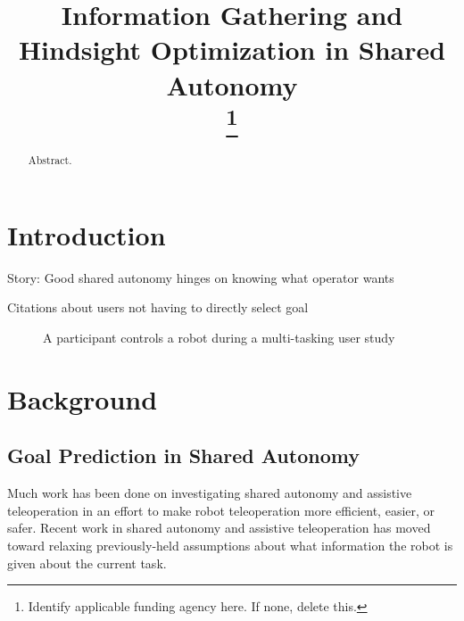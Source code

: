 \documentclass[conference]{IEEEtran}
\begin{document}
\title{Information Gathering and Hindsight Optimization in Shared Autonomy\\
\thanks{Identify applicable funding agency here. If none, delete this.}
}

\author{
\and
{}
}

\maketitle

\begin{abstract}
Abstract.
\end{abstract}

\section{Introduction}

Story: Good shared autonomy hinges on knowing what operator wants

Citations about users not having to directly select goal

\begin{figure}
\caption{A participant controls a robot during a multi-tasking user study}
\label{teaser}
\end{figure}

\section{Background}
\subsection{Goal Prediction in Shared Autonomy}

Much work has been done on investigating shared autonomy and assistive teleoperation in an effort to make robot teleoperation more efficient, easier, or safer. Recent work in shared autonomy and assistive teleoperation has moved toward relaxing previously-held assumptions about what information the robot is given about the current task. 
\end{document}
